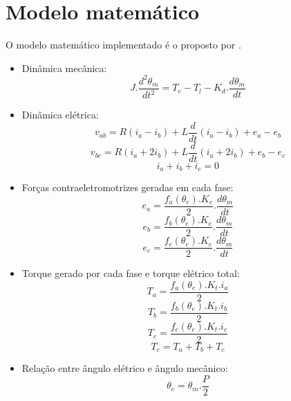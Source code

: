     \section{Modelo matemático}
    O modelo matemático implementado é o proposto por \cite{baldursson}.
    \label{sec:modelo_matematico}
        \begin{itemize}
            \item Dinâmica mecânica: $$J.\frac{d^2\theta_m}{dt^2}=T_e-T_l-K_d.\frac{d\theta_m}{dt}$$
            \item Dinâmica elétrica:
                $$v_{ab} = R(i_a-i_b)+L\frac{d}{dt}(i_a-i_b)+e_a-e_b$$
                $$v_{bc} = R(i_a+2i_b)+L\frac{d}{dt}(i_a+2i_b)+e_b-e_c$$
                $$i_a+i_b+i_c=0$$
            \item Forças contraeletromotrizes geradas em cada fase:
                $$e_a = \frac{f_a(\theta_e).K_e}{2}.\frac{d\theta_m}{dt} $$
                $$e_b = \frac{f_b(\theta_e).K_e}{2}.\frac{d\theta_m}{dt} $$
                $$e_c = \frac{f_c(\theta_e).K_e}{2}.\frac{d\theta_m}{dt} $$
            \item Torque gerado por cada fase e torque elétrico total:
                $$T_a=\frac{f_a(\theta_e).K_t.i_a}{2}$$
                $$T_b=\frac{f_b(\theta_e).K_t.i_b}{2}$$
                $$T_c=\frac{f_c(\theta_e).K_t.i_c}{2}$$
                $$T_e=T_a+T_b+T_c$$
            \item Relação entre ângulo elétrico e ângulo mecânico:
                $$\theta_e=\theta_m.\frac{P}{2}$$
        \end{itemize}

